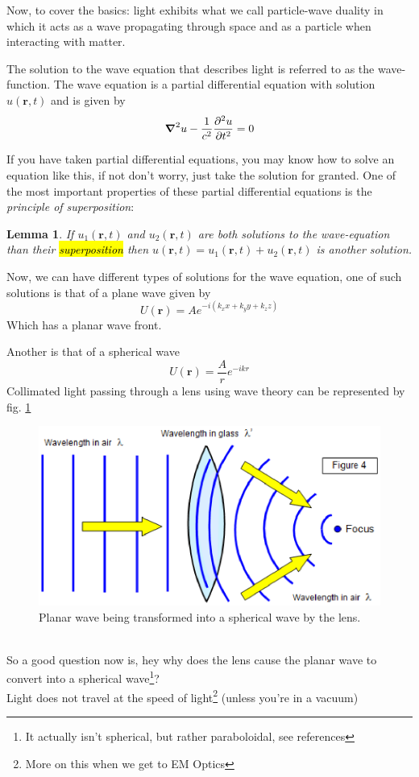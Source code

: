\documentclass{article}
\newtheorem{lemma}[theorem]{Lemma}
\begin{document}
Now, to cover the basics: light exhibits what we call particle-wave duality in which it acts as a wave propagating through space and as a particle when interacting with matter.

The solution to the wave equation that describes light is referred to as the wave-function. The wave equation is a partial differential equation with solution $u(\textbf{r},t)$ and is given by
\begin{equation}
    \grad^2u-\frac{1}{c^2}\frac{\partial^2u}{\partial t^2} = 0
    \label{eq:waveequation}
\end{equation}

If you have taken partial differential equations, you may know how to solve an equation like this, if not don't worry, just take the solution for granted.
One of the most important properties of these partial differential equations is the \emph{principle of superposition}:
\begin{lemma}
If $u_1(\textbf{r},t)$ and $u_2(\textbf{r},t)$ are both solutions to the wave-equation than their \hl{superposition} then $u(\textbf{r},t) = u_1(\textbf{r},t)+u_2(\textbf{r},t)$ is another solution.
\label{superposition_lemma}
\end{lemma}
Now, we can have different types of solutions for the wave equation, one of such solutions is that of a plane wave given by
\begin{equation}
    U(\textbf{r})=Ae^{-i(k_xx+k_yy+k_zz)}
\end{equation}
Which has a planar wave front.

Another is that of a spherical wave
\begin{equation}
    U(\textbf{r})=\frac{A}{r}e^{-ikr}
\end{equation}
Collimated light passing through a lens using wave theory can be represented by fig. \ref{fig:planarwave}
\begin{figure}[!phtb]
    \centering
    \includegraphics[width=0.5\linewidth]{img/planarwave.eps}
    \caption{Planar wave being transformed into a spherical wave by the lens.}
    \label{fig:planarwave}
    \nocite{schoolphysics}
\end{figure}
\\
So a good question now is, hey why does the lens cause the planar wave to convert into a spherical wave\footnote[1]{It actually isn't spherical, but rather paraboloidal, see references}?
\\
Light does not travel at the speed of light\footnote[2]{More on this when we get to EM Optics} (unless you're in a vacuum)
\end{document}
